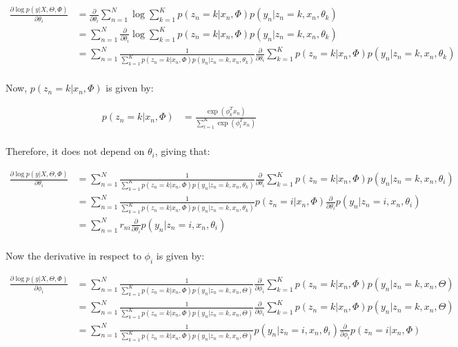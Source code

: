 \documentclass[12pt,a4paper,oneside]{paper}
\begin{document}
\begin{align*}
    \frac{\partial \log p(y | X, \Theta, \Phi)}{\partial \theta_i} &= \frac{\partial}{\partial \theta_i} \sum_{n=1}^{N} \log \sum_{k=1}^{K} p(z_n = k | x_n, \Phi) p(y_n | z_n = k, x_n, \theta_k) \\
    &= \sum_{n=1}^{N} \frac{\partial}{\partial \theta_i} \log \sum_{k=1}^{K} p(z_n = k | x_n, \Phi) p(y_n | z_n = k, x_n, \theta_k) \\
    &= \sum_{n=1}^{N} \frac{1}{\sum_{k=1}^{K} p(z_n = k | x_n, \Phi) p(y_n | z_n = k, x_n, \theta_k)} \frac{\partial}{\partial \theta_i} \sum_{k=1}^{K} p(z_n = k | x_n, \Phi) p(y_n | z_n = k, x_n, \theta_k) \\
\end{align*}

Now, $p(z_n = k | x_n, \Phi)$ is given by:

\begin{align*}
    p(z_n = k | x_n, \Phi) &= \frac{\exp(\phi_k^T x_n)}{\sum_{l=1}^{K} \exp(\phi_l^T x_n)} \\
\end{align*}

Therefore, it does not depend on $\theta_i$, giving that:

\begin{align*}
    \frac{\partial \log p(y | X, \Theta, \Phi)}{\partial \theta_i} &= \sum_{n=1}^{N} \frac{1}{\sum_{k=1}^{K} p(z_n = k | x_n, \Phi) p(y_n | z_n = k, x_n, \theta_k)} \frac{\partial}{\partial \theta_i} \sum_{k=1}^{K} p(z_n = k | x_n, \Phi) p(y_n | z_n = k, x_n, \theta_i) \\
    &= \sum_{n=1}^{N} \frac{1}{\sum_{k=1}^{K} p(z_n = k | x_n, \Phi) p(y_n | z_n = k, x_n, \theta_k)} p(z_n = i | x_n, \Phi) \frac{\partial}{\partial \theta_i} p(y_n | z_n = i, x_n, \theta_i) \\
    &= \sum_{n=1}^{N} r_{ni} \frac{\partial}{\partial \theta_i} p(y_n | z_n = i, x_n, \theta_i) \\
\end{align*}

Now the derivative in respect to $\phi_i$ is given by:

\begin{align*}
    \frac{\partial \log p(y | X, \Theta, \Phi)}{\partial \phi_i} &= \sum_{n=1}^{N} \frac{1}{\sum_{k=1}^{K} p(z_n = k | x_n, \Phi) p(y_n | z_n = k, x_n, \Theta)} \frac{\partial}{\partial \phi_i} \sum_{k=1}^{K} p(z_n = k | x_n, \Phi) p(y_n | z_n = k, x_n, \Theta) \\
    &= \sum_{n=1}^{N} \frac{1}{\sum_{k=1}^{K} p(z_n = k | x_n, \Phi) p(y_n | z_n = k, x_n, \Theta)} \frac{\partial}{\partial \phi_i} \sum_{k=1}^{K} p(z_n = k | x_n, \Phi) p(y_n | z_n = k, x_n, \Theta) \\
    &= \sum_{n=1}^{N} \frac{1}{\sum_{k=1}^{K} p(z_n = k | x_n, \Phi) p(y_n | z_n = k, x_n, \Theta)} p(y_n | z_n = i, x_n, \theta_i) \frac{\partial}{\partial \phi_i} p(z_n = i | x_n, \Phi) \\
\end{align*}


\clearpage

\appendix


\newpage
\printbibliography
\end{document}
